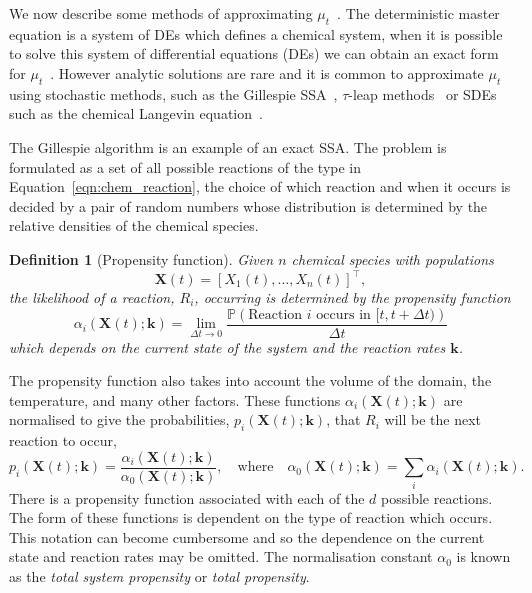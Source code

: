 \documentclass[final]{siamltex}
\newtheorem{dfn}{Definition}[section]
\begin{document}
We now describe some methods of approximating $\mu_t$~\cite{gillespie1991markov}. The deterministic master equation is a system of DEs which defines a chemical system, when it is possible to solve this system of differential equations (DEs) we can obtain an exact form for $\mu_t$~\cite{anderson2016product,jahnke2007solving,anderson2010product}. However analytic solutions are rare and it is common to approximate $\mu_t$ using stochastic methods, such as the Gillespie SSA~\cite{gillespie1977exact}, $\tau$-leap methods~\cite{cao2006efficient,cao2005avoiding,chatterjee2005binomial} or SDEs such as the chemical Langevin equation~\cite{gillespie2000chemical}.


The Gillespie algorithm is an example of an exact SSA. The problem is formulated as a set of all possible reactions of the type in Equation~\eqref{eqn:chem_reaction}, the choice of which reaction and when it occurs is decided by a pair of random numbers whose distribution is determined by the relative densities of the chemical species.

\begin{dfn}[Propensity function]
Given $n$ chemical species with populations
\[
	\mathbf{X}(t) = [X_1(t),\dots,X_n(t)]^\top,
\]
the likelihood of a reaction, $R_i$, occurring is determined by the \emph{propensity function}
\[
	\alpha_i(\mathbf{X}(t); \mathbf{k}) = \lim\limits_{\Delta t\rightarrow 0} \! \frac{\mathbb{P}(\text{Reaction $i$ occurs in $[t, t+\Delta t)$})}{\Delta t}
\]
which depends on the current state of the system and the reaction rates $\mathbf{k}$.
\end{dfn}

The propensity function also takes into account the volume of the domain, the temperature, and many other factors. These functions $\alpha_i(\mathbf{X}(t);\mathbf{k})$ are normalised to give the probabilities, $p_i(\mathbf{X}(t);\mathbf{k})$, that $R_i$ will be the next reaction to occur,
\[
	p_i(\mathbf{X}(t); \mathbf{k}) = \frac{\alpha_i(\mathbf{X}(t);\mathbf{k})}{\alpha_0(\mathbf{X}(t);\mathbf{k})}, \quad \text{where} \quad \alpha_0(\mathbf{X}(t);\mathbf{k}) = \sum_i \! \alpha_i(\mathbf{X}(t);\mathbf{k}).
\]
There is a propensity function associated with each of the $d$ possible reactions. The form of these functions is dependent on the type of reaction which occurs. This notation can become cumbersome and so the dependence on the current state and reaction rates may be omitted. The normalisation constant $\alpha_0$ is known as the \emph{total system propensity} or \emph{total propensity}.
\end{document}
